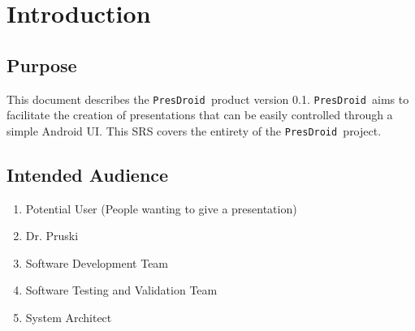 \documentclass{article}
\newcommand{\pd}{\texttt{PresDroid }}
\begin{document}

\normalsize

\newpage
\tableofcontents

\newpage
\section{Introduction}
\subsection{Purpose}

This document describes the \pd product version 0.1.
\pd aims to facilitate the creation of presentations that can be easily controlled through a simple Android UI. 
This SRS covers the entirety of the \pd project.



\subsection{Intended Audience} %

\begin{enumerate}
\item Potential User (People wanting to give a presentation)
\item Dr. Pruski
\item Software Development Team
\item Software Testing and Validation Team
\item System Architect
\end{enumerate}
\end{document}
